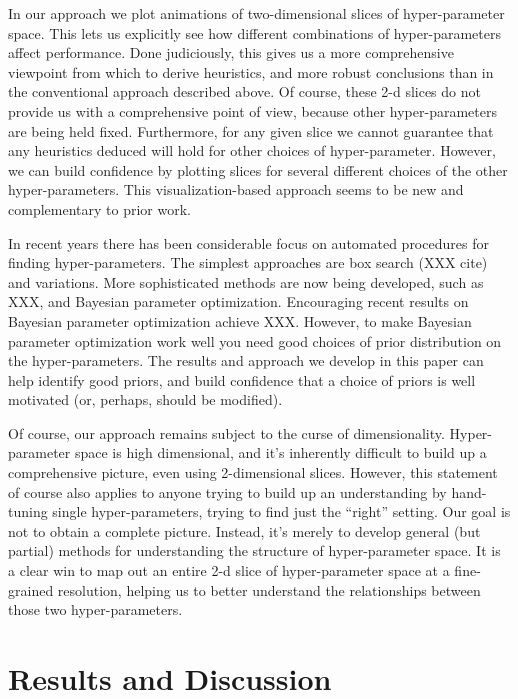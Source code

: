 \documentclass[10pt]{article}
\begin{document}
%
%
In our approach we plot animations of two-dimensional slices of
hyper-parameter space.  This lets us explicitly see how different
combinations of hyper-parameters affect performance.  Done
judiciously, this gives us a more comprehensive viewpoint from which
to derive heuristics, and more robust conclusions than in the
conventional approach described above.  Of course, these 2-d slices do
not provide us with a comprehensive point of view, because other
hyper-parameters are being held fixed.  Furthermore, for any given
slice we cannot guarantee that any heuristics deduced will hold for
other choices of hyper-parameter.  However, we can build confidence by
plotting slices for several different choices of the other
hyper-parameters.  This visualization-based approach seems to be new
and complementary to prior work.

%
%
In recent years there has been considerable focus on automated
procedures for finding hyper-parameters.  The simplest approaches are
box search (XXX cite) and variations.  More sophisticated methods are
now being developed, such as XXX, and Bayesian parameter optimization.
Encouraging recent results on Bayesian parameter optimization achieve
XXX.  However, to make Bayesian parameter optimization work well you
need good choices of prior distribution on the hyper-parameters.  The
results and approach we develop in this paper can help identify good
priors, and build confidence that a choice of priors is well motivated
(or, perhaps, should be modified).

%
%
Of course, our approach remains subject to the curse of
dimensionality.  Hyper-parameter space is high dimensional, and it's
inherently difficult to build up a comprehensive picture, even using
2-dimensional slices.  However, this statement of course also applies
to anyone trying to build up an understanding by hand-tuning single
hyper-parameters, trying to find just the ``right'' setting.  Our goal
is not to obtain a complete picture.  Instead, it's merely to develop
general (but partial) methods for understanding the structure of
hyper-parameter space.  It is a clear win to map out an entire 2-d
slice of hyper-parameter space at a fine-grained resolution, helping
us to better understand the relationships between those two
hyper-parameters.

\section*{Results and Discussion}
\end{document}
